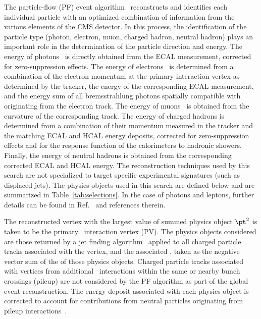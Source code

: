 The particle-flow (PF) event algorithm~\cite{CMS-PRF-14-001}
reconstructs and identifies each individual particle with an optimized
combination of information from the various elements of the CMS
detector. In this process, the identification of the particle type
(photon, electron, muon, charged hadron, neutral hadron) plays an
important role in the determination of the particle direction and
energy. The energy of photons~\cite{Khachatryan:2015iwa} is directly
obtained from the ECAL measurement, corrected for zero-suppression
effects. The energy of electrons~\cite{Khachatryan:2015hwa} is
determined from a combination of the electron momentum at the primary
interaction vertex as determined by the tracker, the energy of the
corresponding ECAL measurement, and the energy sum of all
bremsstrahlung photons spatially compatible with originating from the
electron track. The energy of muons~\cite{Chatrchyan:2012xi} is
obtained from the curvature of the corresponding track. The energy of
charged hadrons is determined from a combination of their momentum
measured in the tracker and the matching ECAL and HCAL energy
deposits, corrected for zero-suppression effects and for the response
function of the calorimeters to hadronic showers. Finally, the energy
of neutral hadrons is obtained from the corresponding corrected ECAL
and HCAL energy. The reconstruction techniques used by this search are
not specialized to target specific experimental signatures (such as
displaced jets). The physics objects used in this search are defined
below and are summarized in Table~\ref{tab:selections}. In the case of
photons and leptons, further details can be found in
Ref.~\cite{Khachatryan:2016dvc} and references therein.

The reconstructed vertex with the largest value of summed physics
object $\pt^2$ is taken to be the primary \Pp\Pp\ interaction vertex
(PV). The physics objects considered are those returned by a jet
finding algorithm~\cite{Cacciari:2008gp, Cacciari:2011ma} applied to
all charged particle tracks associated with the vertex, and the
associated \ptmiss, taken as the negative vector sum of the \pt of
those physics objects. Charged particle tracks associated with
vertices from additional \Pp\Pp\ interactions within the same or
nearby bunch crossings (pileup) are not considered by the PF algorithm
as part of the global event reconstruction. The energy deposit
associated with each physics object %
is corrected to account for contributions from neutral particles
originating from pileup interactions~\cite{Cacciari:2007fd}.

